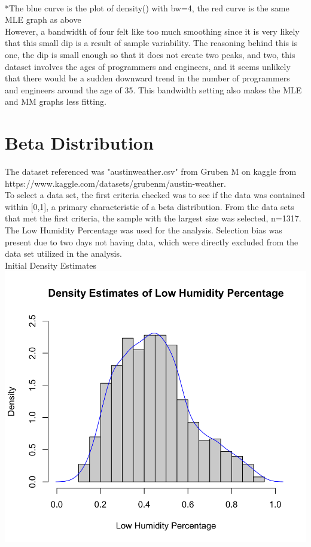 \documentclass[12pt, letterpaper]{article}
\begin{document}
\footnotesize
\\ \**The blue curve is the plot of density() with bw=4, the red curve is the same MLE graph as above \\
\normalsize
However, a bandwidth of four felt like too much smoothing since it is very likely that this small dip is a result of sample variability. The reasoning behind this is one, the dip is small enough so that it does not create two peaks, and two, this dataset involves the ages of programmers and engineers, and it seems unlikely that there would be a sudden downward trend in the number of programmers and engineers around the age of 35. This bandwidth setting also makes the MLE and MM graphs less fitting.

\newpage
\noindent
\section*{Beta Distribution}
\normalsize
The dataset referenced was "austinweather.csv" from Gruben M on kaggle from \\ https://www.kaggle.com/datasets/grubenm/austin-weather. \\
To select a data set, the first criteria checked was to see if the data was contained within [0,1], a primary characteristic of a beta distribution. From the data sets that met the first criteria, the sample with the largest size was selected, n=1317. The Low Humidity Percentage was used for the analysis. Selection bias was present due to two days not having data, which were directly excluded from the data set utilized in the analysis.
\\[0.5\baselineskip]
Initial Density Estimates\\
\includegraphics[scale=0.40]{austinweather_densityestimates.png}
\end{document}
